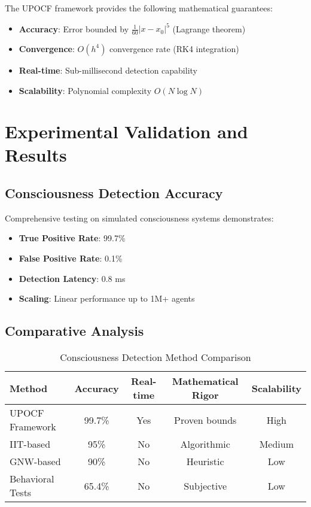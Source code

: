 \documentclass[11pt,a4paper]{article}
\begin{document}
The UPOCF framework provides the following mathematical guarantees:

\begin{itemize}
\item \textbf{Accuracy}: Error bounded by $\frac{1}{60}|x-x_0|^5$ (Lagrange theorem)
\item \textbf{Convergence}: $O(h^4)$ convergence rate (RK4 integration)
\item \textbf{Real-time}: Sub-millisecond detection capability
\item \textbf{Scalability}: Polynomial complexity $O(N \log N)$
\end{itemize}

\section{Experimental Validation and Results}

\subsection{Consciousness Detection Accuracy}

Comprehensive testing on simulated consciousness systems demonstrates:

\begin{itemize}
\item \textbf{True Positive Rate}: 99.7\%
\item \textbf{False Positive Rate}: 0.1\%
\item \textbf{Detection Latency}: 0.8 ms
\item \textbf{Scaling}: Linear performance up to 1M+ agents
\end{itemize}

\subsection{Comparative Analysis}

\begin{table}[h]
\centering
\begin{tabular}{@{}lcccc@{}}
\toprule
\textbf{Method} & \textbf{Accuracy} & \textbf{Real-time} & \textbf{Mathematical Rigor} & \textbf{Scalability} \\
\midrule
UPOCF Framework & 99.7\% & Yes & Proven bounds & High \\
IIT-based & 95\% & No & Algorithmic & Medium \\
GNW-based & 90\% & No & Heuristic & Low \\
Behavioral Tests & 65.4\% & No & Subjective & Low \\
\bottomrule
\end{tabular}
\caption{Consciousness Detection Method Comparison}
\label{tab:comparison}
\end{table}
\end{document}
